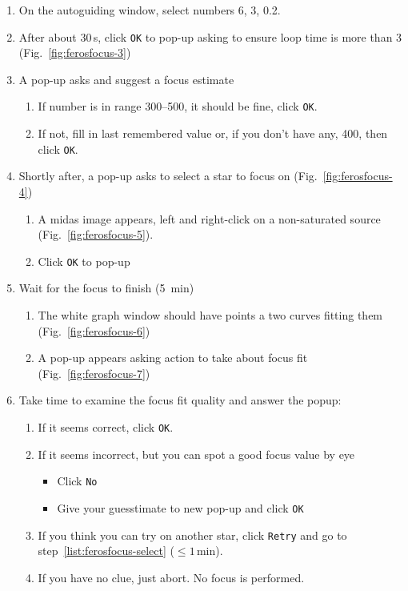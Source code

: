 \documentclass[11pt,fleqn,a4paper]{book}
\begin{document}
\begin{enumerate}
\begin{enumerate}
     \item On the \gls{autoguiding} window, select numbers 6, 3, 0.2.
     \item After about 30\,s, click \texttt{OK} to pop-up asking to ensure loop time is more than 3 (Fig.~\ref{fig:ferosfocus-3})
     \item A pop-up asks and suggest a \gls{focus} estimate
       \begin{enumerate}
         \item If number is in range 300--500, it should be fine, click \texttt{OK}.
         \item If not, fill in last remembered value or, if you don't have any, 400, then click \texttt{OK}.
       \end{enumerate}
     \item\label{list:ferosfocus-select} Shortly after, a pop-up asks to select a star to \gls{focus} on (Fig.~\ref{fig:ferosfocus-4})
        \begin{enumerate}
           \item A \gls{midas} image appears, left and right-click on a non-saturated source (Fig.~\ref{fig:ferosfocus-5}). 
           \item Click \texttt{OK} to pop-up
        \end{enumerate}
     \item Wait for the focus to finish (5~min)
     \begin{enumerate}  
        \item The white graph window should have points a two curves fitting them (Fig.~\ref{fig:ferosfocus-6})
        \item A pop-up appears asking action to take about focus fit (Fig.~\ref{fig:ferosfocus-7})
     \end{enumerate}
     \item Take time to examine the focus fit quality and answer the popup: 
        \begin{enumerate}
           \item If it seems correct, click \texttt{OK}.
           \item If it seems incorrect, but you can spot a good \gls{focus} value by eye
             \begin{itemize}
                \item Click \texttt{No} 
                \item Give your guesstimate to new pop-up and click \texttt{OK}
             \end{itemize}
           \item If you think you can try on another star, click \texttt{Retry} and go to step~\ref{list:ferosfocus-select} ($\le 1$\,min).
           \item If you have no clue, just abort. No focus is performed.
        \end{enumerate} 
  \end{enumerate}
\end{enumerate}
\end{document}
